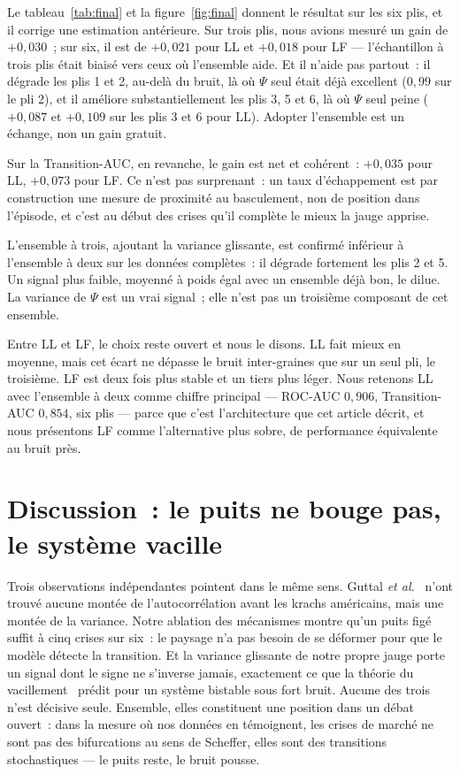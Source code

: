 \documentclass[11pt,a4paper]{article}
\newcommand{\Psiv}{\Psi}
\begin{document}
Le tableau~\ref{tab:final} et la figure~\ref{fig:final} donnent le résultat sur les six plis, et il corrige une estimation antérieure. Sur trois plis, nous avions mesuré un gain de $+0{,}030$~; sur six, il est de $+0{,}021$ pour LL et $+0{,}018$ pour LF --- l'échantillon à trois plis était biaisé vers ceux où l'ensemble aide. Et il n'aide pas partout~: il dégrade les plis 1 et 2, au-delà du bruit, là où $\Psiv$ seul était déjà excellent ($0{,}99$ sur le pli 2), et il améliore substantiellement les plis 3, 5 et 6, là où $\Psiv$ seul peine ($+0{,}087$ et $+0{,}109$ sur les plis 3 et 6 pour LL). Adopter l'ensemble est un échange, non un gain gratuit.

Sur la Transition-AUC, en revanche, le gain est net et cohérent~: $+0{,}035$ pour LL, $+0{,}073$ pour LF. Ce n'est pas surprenant~: un taux d'échappement est par construction une mesure de proximité au basculement, non de position dans l'épisode, et c'est au début des crises qu'il complète le mieux la jauge apprise.

L'ensemble à trois, ajoutant la variance glissante, est confirmé inférieur à l'ensemble à deux sur les données complètes~: il dégrade fortement les plis 2 et 5. Un signal plus faible, moyenné à poids égal avec un ensemble déjà bon, le dilue. La variance de $\Psiv$ est un vrai signal~; elle n'est pas un troisième composant de cet ensemble.

Entre LL et LF, le choix reste ouvert et nous le disons. LL fait mieux en moyenne, mais cet écart ne dépasse le bruit inter-graines que sur un seul pli, le troisième. LF est deux fois plus stable et un tiers plus léger. Nous retenons LL avec l'ensemble à deux comme chiffre principal --- ROC-AUC $0{,}906$, Transition-AUC $0{,}854$, six plis --- parce que c'est l'architecture que cet article décrit, et nous présentons LF comme l'alternative plus sobre, de performance équivalente au bruit près.

\section{Discussion~: le puits ne bouge pas, le système vacille}
\label{sec:discussion}

Trois observations indépendantes pointent dans le même sens. Guttal \emph{et al.}~\cite{guttal2016} n'ont trouvé aucune montée de l'autocorrélation avant les krachs américains, mais une montée de la variance. Notre ablation des mécanismes montre qu'un puits figé suffit à cinq crises sur six~: le paysage n'a pas besoin de se déformer pour que le modèle détecte la transition. Et la variance glissante de notre propre jauge porte un signal dont le signe ne s'inverse jamais, exactement ce que la théorie du vacillement~\cite{wang2012,dakos2013} prédit pour un système bistable sous fort bruit. Aucune des trois n'est décisive seule. Ensemble, elles constituent une position dans un débat ouvert~: dans la mesure où nos données en témoignent, les crises de marché ne sont pas des bifurcations au sens de Scheffer, elles sont des transitions stochastiques --- le puits reste, le bruit pousse.
\end{document}
